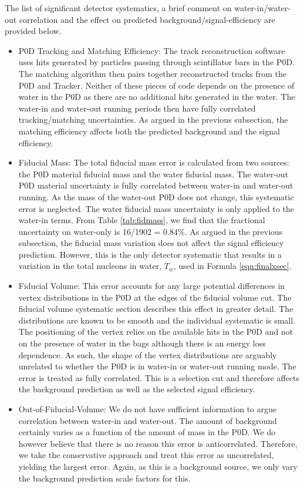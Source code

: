 The list of significant detector systematics, a brief comment on water-in/water-out correlation and the effect on predicted background/signal-efficiency are provided below.
\begin{itemize}
\item P0D Tracking and Matching Efficiency: The track reconstruction software uses hits generated by particles passing through scintillator bars in the P0D. The matching algorithm then pairs together reconstructed tracks from the P0D and Tracker. Neither of these pieces of code depends on the presence of water in the P0D as there are no additional hits generated in the water. The water-in and water-out running periods then have fully correlated tracking/matching uncertainties. As argued in the previous subsection, the matching efficiency affects both the predicted background and the signal efficiency.
\item Fiducial Mass: The total fiducial mass error is calculated from two sources: the P0D material fiducial mass and the water fiducial mass. The water-out P0D material uncertainty is fully correlated between water-in and water-out running. As the mass of the water-out P0D does not change, this systematic error is neglected. The water fiducial mass uncertainty is only applied to the water-in terms. From Table \ref{tab:fidmass}, we find that the fractional uncertainty on water-only is 16/1902 = 0.84\%. As argued in the previous subsection, the fiducial mass variation does not affect the signal efficiency prediction. However, this is the only detector systematic that results in a variation in the total nucleons in water, $T_w$, used in Formula \ref{eqn:finalxsec}.
\item Fiducial Volume: This error accounts for any large potential differences in vertex distributions in the P0D at the edges of the fiducial volume cut. The fiducial volume systematic section describes this effect in greater detail. The distributions are known to be smooth and the individual systematic is small. The positioning of the vertex relies on the available hits in the P0D and not on the presence of water in the bags although there is an energy loss dependence. As such, the shape of the vertex distributions are arguably unrelated to whether the P0D is in water-in or water-out running mode. The error is treated as fully correlated. This is a selection cut and therefore affects the background prediction as well as the selected signal efficiency.
\item Out-of-Fiducial-Volume: We do not have sufficient information to argue correlation between water-in and water-out. The amount of background certainly varies as a function of the amount of mass in the P0D. We do however believe that there is no reason this error is anticorrelated. Therefore, we take the conservative approach and treat this error as uncorrelated, yielding the largest error. Again, as this is a background source, we only vary the background prediction scale factors for this.

\end{itemize}
